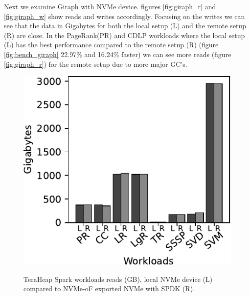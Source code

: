  Next we examine Giraph with NVMe device. figures \ref{fig:giraph_r} and \ref{fig:giraph_w} show
 reads and writes accordingly. Focusing on the writes we can see that the data
 in Gigabytes for both the local setup (L) and the remote setup (R) are close.
 In the PageRank(PR)	and CDLP workloads where the local setup (L) has the
 best performance compared to the remote setup (R) (figure
 \ref{fig:bench_giraph} 22.97\% and 16.24\% faster) we can see more reads
 (figure \ref{fig:giraph_r}) for the remote setup due to more major GC's.

\begin{figure}[H]
  \includegraphics[width=\linewidth]{figures/spark_r.pdf}\\
\caption{TeraHeap Spark workloads reads (GB). local NVMe device (L) compared to NVMe-oF exported NVMe with SPDK (R).}
\label{fig:spark_r}
\end{figure}
